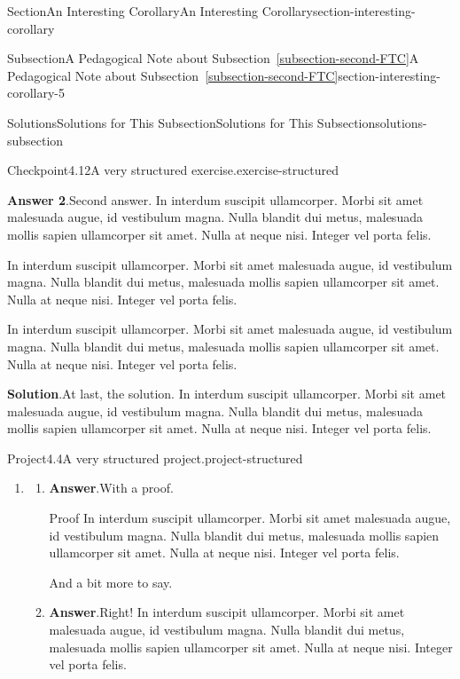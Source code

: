 \documentclass[twoside,10pt,]{article}
\newcommand{\blocktitlefont}{\relax}
\newcommand{\xreffont}{\relax}
\numberwithin{equation}{section}
\begin{document}
\begin{sectionptx}{Section}{An Interesting Corollary}{}{An Interesting Corollary}{}{}{section-interesting-corollary}
\begin{subsectionptx}{Subsection}{A Pedagogical Note about Subsection~{\xreffont\ref*{subsection-second-FTC}}}{}{A Pedagogical Note about Subsection~{\xreffont\ref*{subsection-second-FTC}}}{}{}{section-interesting-corollary-5}
\begin{solutions-subsubsection}{Solutions}{Solutions for This Subsection}{}{Solutions for This Subsection}{}{}{solutions-subsection}
\begin{inlinesolution}{Checkpoint}{4.12}{A very structured exercise.}{exercise-structured}
\begin{enumerate}[font=\bfseries,label=(\alph*),ref=\alph*]
\par\smallskip%
\noindent\textbf{\blocktitlefont Answer 2}.\hypertarget{exercise-structured-6-4-main}{}\quad{}Second answer.  In interdum suscipit ullamcorper. Morbi sit amet malesuada augue, id vestibulum magna. Nulla blandit dui metus, malesuada mollis sapien ullamcorper sit amet. Nulla at neque nisi. Integer vel porta felis.%
\par
In interdum suscipit ullamcorper. Morbi sit amet malesuada augue, id vestibulum magna. Nulla blandit dui metus, malesuada mollis sapien ullamcorper sit amet. Nulla at neque nisi. Integer vel porta felis.%
\par
In interdum suscipit ullamcorper. Morbi sit amet malesuada augue, id vestibulum magna. Nulla blandit dui metus, malesuada mollis sapien ullamcorper sit amet. Nulla at neque nisi. Integer vel porta felis.%
\par\smallskip%
\noindent\textbf{\blocktitlefont Solution}.\hypertarget{exercise-structured-6-5-main}{}\quad{}At last, the solution.  In interdum suscipit ullamcorper. Morbi sit amet malesuada augue, id vestibulum magna. Nulla blandit dui metus, malesuada mollis sapien ullamcorper sit amet. Nulla at neque nisi. Integer vel porta felis.%
\end{enumerate}%
\end{inlinesolution}%
\begin{projectsolution}{Project}{4.4}{A very structured project.}{project-structured}%
\begin{enumerate}[font=\bfseries,label=(\alph*),ref=\alph*]%
\item[(c)]\begin{enumerate}[font=\bfseries,label=(\roman*),ref=\theenumi.\roman*]%
\item[(i)]\noindent\textbf{\blocktitlefont Answer}.\hypertarget{project-structured-6-2-2-main}{}\quad{}With a proof.%
\begin{solutionproof}{Proof}
In interdum suscipit ullamcorper. Morbi sit amet malesuada augue, id vestibulum magna. Nulla blandit dui metus, malesuada mollis sapien ullamcorper sit amet. Nulla at neque nisi. Integer vel porta felis.%
\end{solutionproof}
And a bit more to say.%
\item[(ii)]\noindent\textbf{\blocktitlefont Answer}.\hypertarget{project-structured-6-3-2-main}{}\quad{}Right!  In interdum suscipit ullamcorper. Morbi sit amet malesuada augue, id vestibulum magna. Nulla blandit dui metus, malesuada mollis sapien ullamcorper sit amet. Nulla at neque nisi. Integer vel porta felis.%

\end{enumerate}
\end{enumerate}
\end{projectsolution}
\end{solutions-subsubsection}
\end{subsectionptx}
\end{sectionptx}
\end{document}
